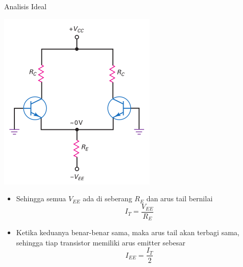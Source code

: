 \documentclass[aspectratio=169]{beamer}
\begin{document}
\begin{frame}{Analisis Ideal}
	\begin{multicols}{2}
		\begin{center}
			\includegraphics[width=0.7\textheight]{gambar/01.diff-amp/01.ideal_dc_analysis}
		\end{center}
		\columnbreak
		\begin{itemize}
			\item Sehingga semua $ V_{EE} $ ada di seberang $ R_E $ dan arus tail bernilai
			\begin{equation} \label{pers.5}
				I_T = \frac{V_{EE}}{R_E}
			\end{equation}
			\item Ketika keduanya benar-benar sama, maka arus tail akan terbagi sama, sehingga tiap transistor memiliki arus emitter sebesar \\
			\begin{equation} \label{pers.6}
				I_{EE} = \frac{I_T}{2}
			\end{equation}
		\end{itemize}
		\vfill\null
	\end{multicols}
\end{frame}
\end{document}
